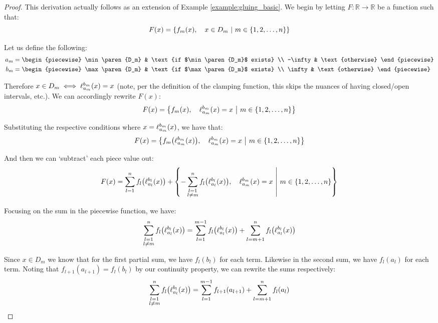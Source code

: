 \begin{proof}
    This derivation actually follows as an extension of Example \ref{example:gluing_basic}. We begin by letting $F:\mathbb{R}\to\mathbb{R}$ be a function such that:
    $$
        F(x) = \left\{f_m(x),\quad x\in D_m\ \middle|\ m\in\{1,2,\dots,n\}\right\}
    $$

    Let us define the following:
    \begin{align*}
        a_m &= \begin{piecewise}
            \min\paren{D_m} & \text{if $\min\paren{D_m}$ exists} \\
            -\infty & \text{otherwise}
        \end{piecewise} \\
        b_m &= \begin{piecewise}
            \max\paren{D_m} & \text{if $\max\paren{D_m}$ exists} \\
            \infty & \text{otherwise}
        \end{piecewise}
    \end{align*}

    Therefore $x\in D_m\iff \ell_{a_m}^{b_m}(x)=x$ (note, per the definition of the clamping function, this skips the nuances of having closed/open intervals, etc.). We can accordingly rewrite $F(x)$:
    $$
        F(x) = \left\{f_m(x),\quad \ell_{a_m}^{b_m}(x)=x\ \middle|\ m\in\{1,2,\dots,n\}\right\}
    $$

    Substituting the respective conditions where $x=\ell_{a_m}^{b_m}(x)$, we have that:
    $$
        F(x) = \pwobj{f_m\paren*{\ell_{a_m}^{b_m}\paren{x}}}{\ell_{a_m}^{b_m}\paren{x}=x}{m\in\br{1,2,\dots,n}}
    $$

    And then we can `subtract' each piece value out:
    $$
        F(x) = \sum_{l=1}^{n}{f_l\paren*{\ell_{a_l}^{b_l}\paren{x}}}+\pwobj{-\sum_{\substack{l=1\\l\neq m}}^{n}{f_l\paren*{\ell_{a_l}^{b_l}\paren{x}}}}{\ell_{a_m}^{b_m}\paren{x}=x}{m\in\br{1,2,\dots,n}}
    $$

    Focusing on the sum in the piecewise function, we have:
    $$
        \sum_{\substack{l=1\\l\neq m}}^{n}{f_l\paren*{\ell_{a_l}^{b_l}\paren{x}}} = \sum_{l=1}^{m-1}{f_l\paren*{\ell_{a_l}^{b_l}\paren{x}}}+\sum_{l=m+1}^{n}{f_l\paren*{\ell_{a_l}^{b_l}\paren{x}}}
    $$

    Since $x\in D_m$ we know that for the first partial sum, we have $f_l(b_l)$ for each term. Likewise in the second sum, we have $f_l(a_l)$ for each term. Noting that $f_{l+1}(a_{l+1})=f_l(b_l)$ by our continuity property, we can rewrite the sums respectively:
    $$
        \sum_{\substack{l=1\\l\neq m}}^{n}{f_l\paren*{\ell_{a_l}^{b_l}\paren{x}}} = \sum_{l=1}^{m-1}{f_{l+1}\paren*{a_{l+1}}}+\sum_{l=m+1}^{n}{f_l\paren*{a_l}}
    $$


\end{proof}
